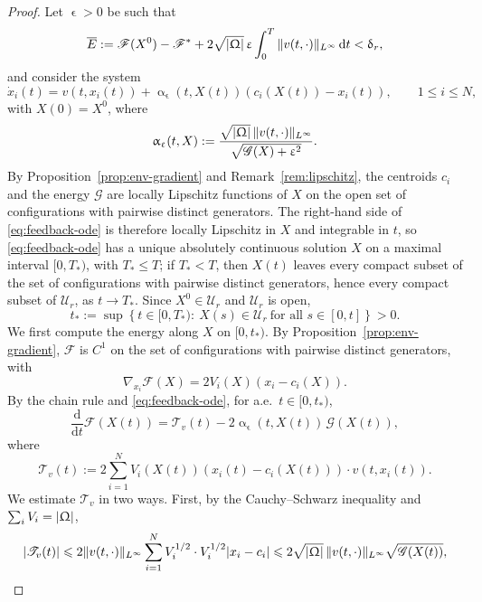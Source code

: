 \documentclass[letterpaper,11pt,twoside]{article}
\numberwithin{figure}{section}
\numberwithin{table}{section}
\theoremstyle{cpamplain}
\theoremstyle{cpamdefinition}
\newcommand{\diff}{\mathrm{d}}
\let\alpha\upalpha
\let\delta\updelta
\let\varepsilon\upvarepsilon
\let\Omega\Upomega
\renewcommand{\le}{\leqslant}
\numberwithin{equation}{section}
\begin{document}
\begin{proof}
Let $\varepsilon>0$ be such that
\begin{equation}\label{eq:Ebar}
\overline E:=
\mathscr F(X^0)-\mathscr F^\ast
+2\sqrt{|\Omega|}\,\varepsilon\int_0^T\|v(t,\cdot)\|_{L^\infty}\,\diff t
<\delta_r,
\end{equation}
and consider the system
\begin{equation}\label{eq:feedback-ode}
\dot x_i(t)=v(t,x_i(t))+\alpha_\varepsilon(t,X(t))\left(c_i(X(t))-x_i(t)\right),
\qquad 1\le i\le N,
\end{equation}
with $X(0)=X^0$, where
\[
\alpha_\varepsilon(t,X):=
\frac{\sqrt{|\Omega|}\,\|v(t,\cdot)\|_{L^\infty}}
{\sqrt{\mathscr G(X)+\varepsilon^2}} .
\]
By Proposition~\ref{prop:env-gradient} and Remark~\ref{rem:lipschitz}, the centroids $c_i$ and the energy $\mathscr G$ are locally Lipschitz functions of $X$ on the open set of configurations with pairwise distinct generators.
The right-hand side of \eqref{eq:feedback-ode} is therefore locally Lipschitz in $X$ and integrable in $t$, so \eqref{eq:feedback-ode} has a unique absolutely continuous solution $X$ on a maximal interval $[0,T_\ast)$, with $T_\ast\le T$; if $T_\ast<T$, then $X(t)$ leaves every compact subset of the set of configurations with pairwise distinct generators, hence every compact subset of $\mathcal U_r$, as $t\to T_\ast$.
Since $X^0\in\mathcal U_r$ and $\mathcal U_r$ is open,
\[
t_\ast:=\sup\left\{t\in[0,T_\ast):\ X(s)\in\mathcal U_r\ \text{for all }s\in[0,t]\right\}>0 .
\]
We first compute the energy along $X$ on $[0,t_\ast)$.
By Proposition~\ref{prop:env-gradient}, $\mathscr F$ is $C^1$ on the set of configurations with pairwise distinct generators, with 
$$
\nabla_{x_i}\mathscr F(X)=2V_i(X)(x_i-c_i(X)).
$$
By the chain rule and \eqref{eq:feedback-ode}, for a.e.\ $t\in[0,t_\ast)$,
\begin{equation}\label{eq:dFdt}
\frac{\diff}{\diff t}\mathscr F(X(t))
=\mathscr T_v(t)-2\alpha_\varepsilon(t,X(t))\,\mathscr G(X(t)),
\end{equation}
where
\[
\mathscr T_v(t):=2\sum_{i=1}^N V_i(X(t))\left(x_i(t)-c_i(X(t))\right)\cdot v(t,x_i(t)).
\]
We estimate $\mathscr T_v$ in two ways. First, by the Cauchy--Schwarz inequality and $\sum_iV_i=|\Omega|$,
\begin{equation}\label{eq:T_bound_CS}
|\mathscr T_v(t)|\le2\|v(t,\cdot)\|_{L^\infty}\sum_{i=1}^N V_i^{1/2}\cdot V_i^{1/2}|x_i-c_i|\le 2\sqrt{|\Omega|}\,\|v(t,\cdot)\|_{L^\infty}\sqrt{\mathscr G(X(t))},
\end{equation}

\end{proof}
\end{document}
